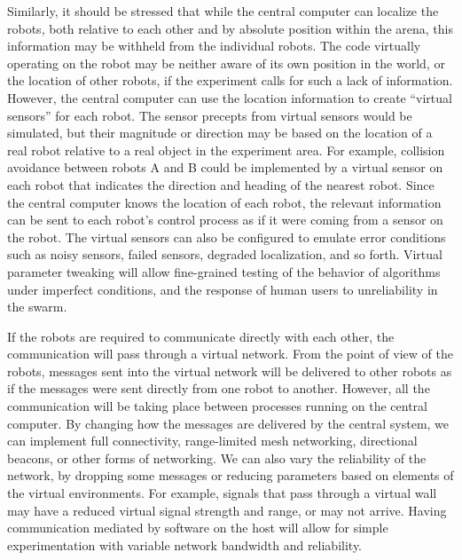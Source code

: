 \documentclass[]{article}
\begin{document}
Similarly, it should be stressed that while the central computer can localize the robots, both relative to each other and by absolute position within the arena, this information may be withheld from the individual robots. 
The code virtually operating on the robot may be neither aware of its own position in the world, or the location of other robots, if the experiment calls for such a lack of information. 
However, the central computer can use the location information to create ``virtual sensors'' for each robot. 
The sensor precepts from virtual sensors would be simulated, but their magnitude or direction may be based on the location of a real robot relative to a real object in the experiment area. 
For example, collision avoidance between robots A and B could be implemented by a virtual sensor on each robot that indicates the direction and heading of the nearest robot. 
Since the central computer knows the location of each robot, the relevant information can be sent to each robot's control process as if it were coming from a sensor on the robot. 
The virtual sensors can also be configured to emulate error conditions such as noisy sensors, failed sensors, degraded localization, and so forth.
Virtual parameter tweaking will allow fine-grained testing of the behavior of algorithms under imperfect conditions, and the response of human users to unreliability in the swarm. 

If the robots are required to communicate directly with each other, the communication will pass through a virtual network. 
From the point of view of the robots, messages sent into the virtual network will be delivered to other robots as if the messages were sent directly from one robot to another. 
However, all the communication will be taking place between processes running on the central computer.
By changing how the messages are delivered by the central system, we can implement full connectivity, range-limited mesh networking, directional beacons, or other forms of networking. 
We can also vary the reliability of the network, by dropping some messages or reducing parameters based on elements of the virtual environments. 
For example, signals that pass through a virtual wall may have a reduced virtual signal strength and range, or may not arrive. 
Having communication mediated by software on the host will allow for simple experimentation with variable network bandwidth and reliability. 
\end{document}
